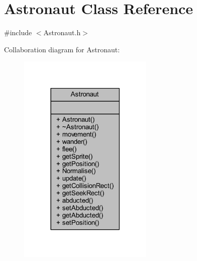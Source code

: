 \hypertarget{class_astronaut}{}\section{Astronaut Class Reference}
\label{class_astronaut}


{\ttfamily \#include $<$Astronaut.\+h$>$}



Collaboration diagram for Astronaut\+:
\nopagebreak
\begin{figure}[H]
\begin{center}
\leavevmode
\includegraphics[width=182pt]{class_astronaut__coll__graph}
\end{center}
\end{figure}

